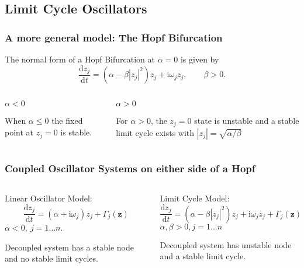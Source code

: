 \documentclass[10pt,reqno]{beamer}
\newcommand{\D}[2]{\frac{\mathrm{d} #1}{\mathrm{d} #2}}
\newcommand{\I}{\mathrm{i}}
\begin{document}
\subsection{Limit Cycle Oscillators}
\begin{frame}
\frametitle{A more general model: The Hopf Bifurcation}
The normal form of a Hopf Bifurcation at $\alpha = 0$ is given by
\[
\D{z_j}{t}= (\alpha - \beta|z_j|^2)z_j + \I\omega_j z_j, \qquad \beta >0.
\]
\begin{columns}[t]
\begin{column}{.49\textwidth}
\centering
$\alpha <0$
\begin{figure}
\end{figure}
When $\alpha \le 0$ the fixed point at $z_j =0$ is stable.
\end{column}
\begin{column}{.49\textwidth}
\centering
$\alpha >0$
\begin{figure}
\end{figure}
For $\alpha>0$, the $z_j=0$ state is unstable and a stable limit cycle exists with $|z_j| = \sqrt{\alpha/\beta}$				
\end{column}
\end{columns}
\end{frame}
\begin{frame}
\frametitle{Coupled Oscillator Systems on either side of a Hopf}
\begin{columns}[t]
\begin{column}{.49\textwidth}
\centering
Linear Oscillator Model:
\[
\D{z_j}{t} = (\alpha +\I\omega_j)z_j+\Gamma_j(\mathbf{z})
\]
$\alpha <0,\ j = 1\dots n$.
\begin{figure}
\end{figure}
Decoupled system has a stable node and no stable limit cycles.
\end{column}
\begin{column}{.49\textwidth}
\centering
Limit Cycle Model:
\[
\D{z_j}{t} = (\alpha - \beta|z_j|^2)z_j + \I\omega_jz_j +\Gamma_j(\mathbf{z})
\]
$\alpha,\beta>0, j = 1\dots n$
\begin{figure}
\end{figure}
Decoupled system has unstable node and a stable limit cycle.
\end{column}
\end{columns}
\end{frame}
\end{document}
